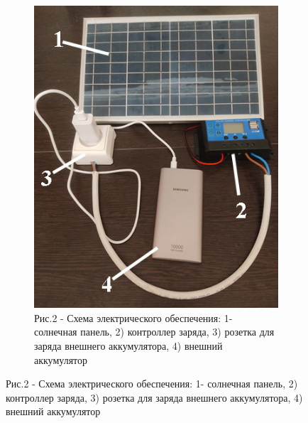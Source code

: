 \begin{figure}[H]
\begin{subfigure}[t]{0.4\textwidth}
        \includegraphics[width=\textwidth]{media/ict/image2}
        \caption*{Рис.2 - Схема электрического обеспечения: 1- солнечная панель, 2) контроллер заряда, 3) розетка для заряда внешнего аккумулятора, 4) внешний аккумулятор}
    \end{subfigure}
\end{figure}

